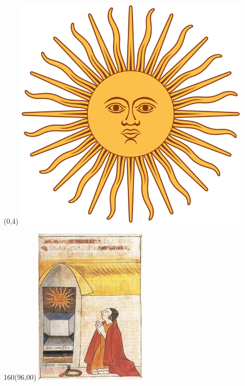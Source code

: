 \documentclass[shownotes,aspectratio=169]{beamer}
\begin{document}
\begin{frame}

\begin{textblock}{96}(0,4)\centering
{\includegraphics[width=0.85\textwidth]{../../inti.png}}
\end{textblock}

\begin{textblock}{160}(96,00)
\includegraphics[width=0.4\textwidth]{../../pachacuteckoricancha}
\end{textblock}

\end{frame}
\end{document}

